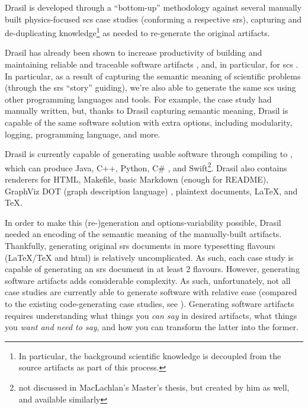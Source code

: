 Drasil is developed through a ``bottom-up'' methodology against several manually
built physics-focused \acs{scs} case studies (conforming a respective
\acs{srs}), capturing and de-duplicating knowledge\footnote{In particular, the
      background scientific knowledge is decoupled from the source artifacts as part
      of this process.} as needed to re-generate the original artifacts.

\caseStudiesTable{}

Drasil has already been shown to increase productivity of building and
maintaining reliable and traceable software artifacts \cite{SzymczakEtAl2016},
and, in particular, for \acs{scs} \cite{Smith2018}. In particular, as a result
of capturing the semantic meaning of scientific problems (through the \acs{srs}
``story'' guiding), we're also able to generate the same \acs{scs} using other
programming languages and tools. For example, the  case study had
manually written, but, thanks to Drasil capturing semantic meaning, Drasil is
capable of
the same software solution with extra options, including modularity, logging,
programming language, and more.

Drasil is currently capable of generating usable software through compiling to
, which can produce Java, C++, Python, C\# \cite{MacLachlan2020}, and
Swift\footnote{not discussed in MacLachlan's Master's thesis, but created by him
      as well, and available similarly}. Drasil also contains renderers for HTML,
Makefile, basic Markdown (enough for README), GraphViz DOT (graph description
language) \cite{Gansner1993}, plaintext documents, \LaTeX{}, and
\TeX{}.

In order to make this (re-)generation and options-variability possible, Drasil
needed an encoding of the semantic meaning of the manually-built artifacts.
Thankfully, generating original \acs{srs} documents in more typesetting flavours
(\LaTeX{}/\TeX{} and \acs{html}) is relatively uncomplicated. As such, each case
study is capable of generating an \acs{srs} document in at least 2 flavours.
However, generating software artifacts adds considerable complexity. As such,
unfortunately, not all case studies are currently able to generate software with
relative ease (compared to the existing code-generating case studies, see
). Generating software artifacts requires
understanding what things you \textit{can say} in desired artifacts, what things
you \textit{want and need to say}, and how you can transform the latter into the
former.


